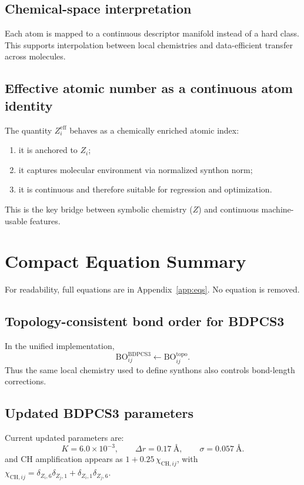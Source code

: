 \documentclass[a4paper,11pt]{article}
\begin{document}
\subsection{Chemical-space interpretation}
Each atom is mapped to a continuous descriptor manifold instead of a hard class. This supports interpolation between local chemistries and data-efficient transfer across molecules.

\subsection{Effective atomic number as a continuous atom identity}
The quantity $Z_i^{\mathrm{eff}}$ behaves as a chemically enriched atomic index:
\begin{enumerate}
\item it is anchored to $Z_i$;
\item it captures molecular environment via normalized synthon norm;
\item it is continuous and therefore suitable for regression and optimization.
\end{enumerate}
This is the key bridge between symbolic chemistry ($Z$) and continuous machine-usable features.

\section{Compact Equation Summary}
For readability, full equations are in Appendix~\ref{app:eqs}. No equation is removed.

\subsection{Topology-consistent bond order for BDPCS3}
In the unified implementation,
\begin{equation}
\mathrm{BO}_{ij}^{\mathrm{BDPCS3}} \leftarrow \mathrm{BO}_{ij}^{\mathrm{topo}}.
\end{equation}
Thus the same local chemistry used to define synthons also controls bond-length corrections.

\subsection{Updated BDPCS3 parameters}
Current updated parameters are:
\begin{equation}
K=6.0\times10^{-3},\qquad
\Delta r=0.17~\text{\AA},\qquad
\sigma=0.057~\text{\AA}.
\end{equation}
and CH amplification appears as $1+0.25\,\chi_{\mathrm{CH},ij}$, with $\chi_{\mathrm{CH},ij}=\delta_{Z_i,6}\delta_{Z_j,1}+\delta_{Z_i,1}\delta_{Z_j,6}$.
\end{document}
